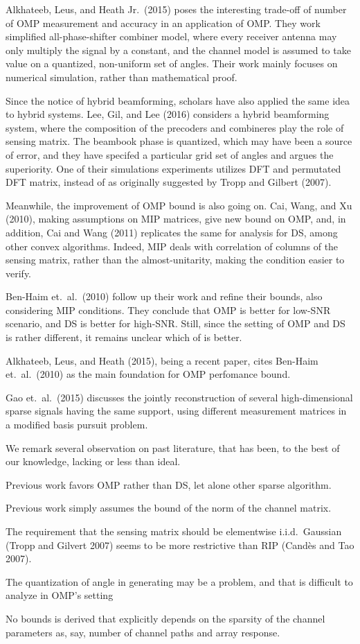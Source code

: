 Alkhateeb, Leus, and Heath Jr.\ (2015) poses the interesting trade-off of number of OMP measurement and accuracy in an application of OMP.
They work simplified all-phase-shifter combiner model, where every receiver antenna may only multiply the signal by a constant, and the channel model is assumed to take value on a quantized, non-uniform set of angles.
Their work mainly focuses on numerical simulation, rather than mathematical proof.

Since the notice of hybrid beamforming, scholars have also applied the same idea to hybrid systems.
Lee, Gil, and Lee (2016) considers a hybrid beamforming system, where the composition of the precoders and combineres play the role of sensing matrix.
The beambook phase is quantized, which may have been a source of error, and they have specifed a particular grid set of angles and argues the superiority.
One of their simulations experiments utilizes DFT and permutated DFT matrix, instead of as originally suggested by Tropp and Gilbert (2007).

Meanwhile, the improvement of OMP bound is also going on.
Cai, Wang, and Xu (2010), making assumptions on MIP matrices, give new bound on OMP, and, in addition, Cai and Wang (2011) replicates the same for analysis for DS, among other convex algorithms.
Indeed, MIP deals with correlation of columns of the sensing matrix, rather than the almost-unitarity, making the condition easier to verify.

Ben-Haim et.\ al.\ (2010) follow up their work and refine their bounds, also considering MIP conditions.
They conclude that OMP is better for low-SNR scenario, and DS is better for high-SNR.
Still, since the setting of OMP and DS is rather different, it remains unclear which of is better.

Alkhateeb, Leus, and Heath (2015), being a recent paper, cites Ben-Haim et.\ al.\ (2010) as the main foundation for OMP perfomance bound.

Gao et.\ al.\ (2015) discusses the jointly reconstruction of several high-dimensional sparse signals having the same support, using different measurement matrices in a modified basis pursuit problem.

We remark several observation on past literature, that has been, to the best of our knowledge, lacking or less than ideal.

\startitemize
\item Previous work favors OMP rather than DS, let alone other sparse algorithm.
\item Previous work simply assumes the bound of the norm of the channel matrix.
\item The requirement that the sensing matrix should be elementwise i.i.d.\ Gaussian (Tropp and Gilvert 2007) seems to be more restrictive than RIP (Cand\`es and Tao 2007).
\item The quantization of angle in generating may be a problem, and that is difficult to analyze in OMP's setting
\item No bounds is derived that explicitly depends on the sparsity of the channel parameters as, say, number of channel paths and array response.
\stopitemize

